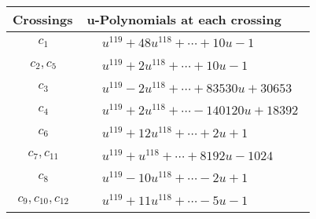 \documentclass[1p]{elsarticle_modified}
\theoremstyle{definition}
\begin{document}
\begin{tabular}{m{50pt}|m{274pt}}
Crossings & \hspace{64pt}u-Polynomials at each crossing \\
\hline $$\begin{aligned}c_{1}\end{aligned}$$&$\begin{aligned}
&u^{119}+48 u^{118}+\cdots+10 u-1
\end{aligned}$\\
\hline $$\begin{aligned}c_{2},c_{5}\end{aligned}$$&$\begin{aligned}
&u^{119}+2 u^{118}+\cdots+10 u-1
\end{aligned}$\\
\hline $$\begin{aligned}c_{3}\end{aligned}$$&$\begin{aligned}
&u^{119}-2 u^{118}+\cdots+83530 u+30653
\end{aligned}$\\
\hline $$\begin{aligned}c_{4}\end{aligned}$$&$\begin{aligned}
&u^{119}+2 u^{118}+\cdots-140120 u+18392
\end{aligned}$\\
\hline $$\begin{aligned}c_{6}\end{aligned}$$&$\begin{aligned}
&u^{119}+12 u^{118}+\cdots+2 u+1
\end{aligned}$\\
\hline $$\begin{aligned}c_{7},c_{11}\end{aligned}$$&$\begin{aligned}
&u^{119}+u^{118}+\cdots+8192 u-1024
\end{aligned}$\\
\hline $$\begin{aligned}c_{8}\end{aligned}$$&$\begin{aligned}
&u^{119}-10 u^{118}+\cdots-2 u+1
\end{aligned}$\\
\hline $$\begin{aligned}c_{9},c_{10},c_{12}\end{aligned}$$&$\begin{aligned}
&u^{119}+11 u^{118}+\cdots-5 u-1
\end{aligned}$\\
\hline
\end{tabular}\\~\\
\end{document}
